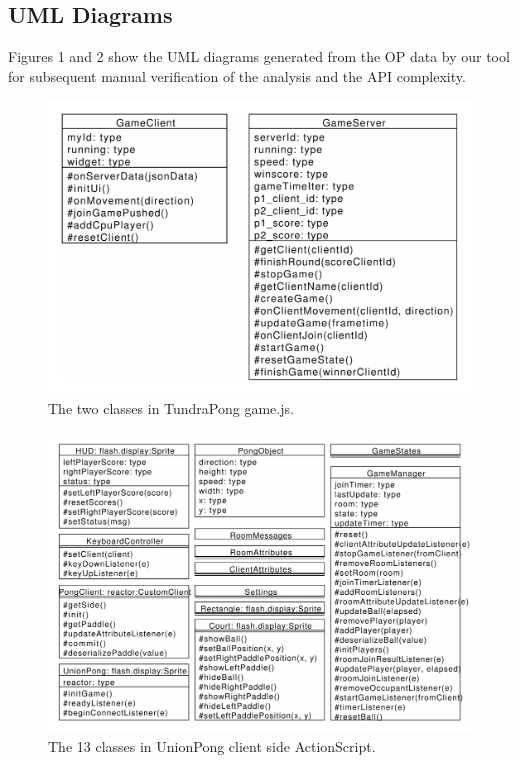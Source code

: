 \documentclass[conference]{IEEEtran}
\begin{document}
\subsection{UML Diagrams%
  \label{uml-diagrams}%
}

Figures 1 and 2 show the UML diagrams generated from the OP data by
our tool for subsequent manual verification of the analysis and the
API complexity.
\begin{figure}
\includegraphics[scale=0.400000]{pics/TundraPong_fontembed.pdf}
\caption{The two classes in TundraPong game.js.}
\end{figure}
\begin{figure}
\includegraphics[scale=0.330000]{pics/UnionPong-manuallayout_fontembed.pdf}
\caption{The 13 classes in UnionPong client side ActionScript.}
\end{figure}
\end{document}

